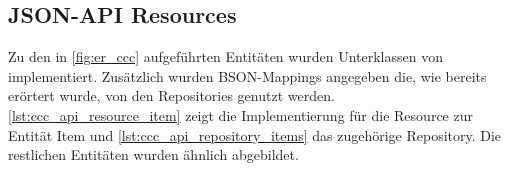 \subsection{JSON-API Resources}
\label{ssec:ba_json_api_resources}

Zu den in \cref{fig:er_ccc} aufgeführten Entitäten wurden Unterklassen von
 implementiert.  Zusätzlich wurden BSON-Mappings
angegeben die, wie bereits erörtert wurde, von den Repositories genutzt
werden.  \cref{lst:ccc_api_resource_item} zeigt die Implementierung für die
Resource zur Entität Item und \cref{lst:ccc_api_repository_items} das zugehörige
Repository.  Die restlichen Entitäten wurden ähnlich abgebildet.




